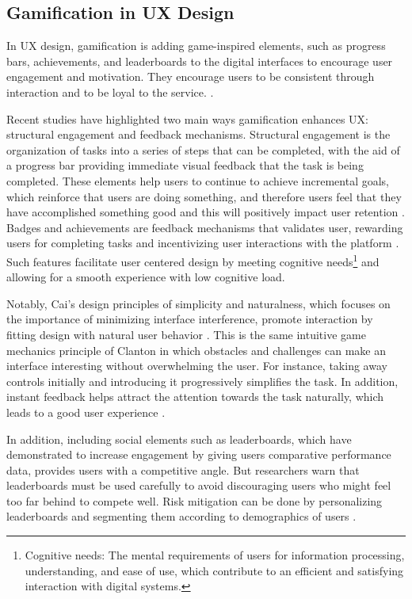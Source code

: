 \documentclass[conference]{IEEEtran}
\begin{document}
\subsection{Gamification in UX Design}

In UX design, gamification is adding game-inspired elements, such as progress bars, achievements, and leaderboards to the digital interfaces to encourage user engagement and motivation. They encourage users to be consistent through interaction and to be loyal to the service. \cite{clanton1998}.

Recent studies have highlighted two main ways gamification enhances UX: structural engagement and feedback mechanisms. Structural engagement is the organization of tasks into a series of steps that can be completed, with the aid of a progress bar providing immediate visual feedback that the task is being completed. These elements help users to continue to achieve incremental goals, which reinforce that users are doing something, and therefore users feel that they have accomplished something good and this will positively impact user retention \cite{marchionini1992, chang2016}. Badges and achievements are feedback mechanisms that validates user, rewarding users for completing tasks and incentivizing user interactions with the platform \cite{deliu2017, cai2009}. Such features facilitate user centered design by meeting cognitive needs\footnote{Cognitive needs: The mental requirements of users for information processing, understanding, and ease of use, which contribute to an efficient and satisfying interaction with digital systems.}
 and allowing for a smooth experience with low cognitive load.

Notably, Cai’s design principles of simplicity and naturalness, which focuses on the importance of minimizing interface interference, promote interaction by fitting design with natural user behavior \cite{cai2009}. This is the same intuitive game mechanics principle of Clanton in which obstacles and challenges can make an interface interesting without overwhelming the user. For instance, taking away controls initially and introducing it progressively simplifies the task. In addition, instant feedback helps attract the attention towards the task naturally, which leads to a good user experience \cite{clanton1998}.

In addition, including social elements such as leaderboards, which have demonstrated to increase engagement by giving users comparative performance data, provides users with a competitive angle. But researchers warn that leaderboards must be used carefully to avoid discouraging users who might feel too far behind to compete well. Risk mitigation can be done by personalizing leaderboards and segmenting them according to demographics of users \cite{saptaputra2021}.
\end{document}
